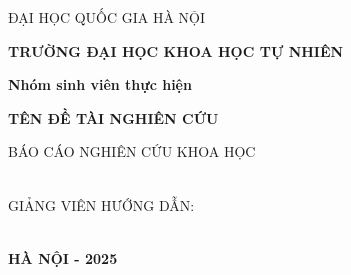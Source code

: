 \begin{titlepage}
\thispagestyle{empty}
\thisfancypage{
\setlength{\fboxrule}{2pt}
\doublebox}{}
\fontsize{15pt}{10pt}\selectfont
\centerline{{ {ĐẠI HỌC QUỐC GIA HÀ NỘI}}}
\centerline{ \bf {TRƯỜNG ĐẠI HỌC KHOA HỌC TỰ NHIÊN}}
\vspace*{2cm}
\centerline{\Large
\textbf{Nhóm sinh viên thực hiện}
}
\fontsize{15pt}{10pt}\selectfont
\vspace*{3cm}
\centerline{ \bf {TÊN ĐỀ TÀI NGHIÊN CỨU}}
\vspace*{0.3cm}

\vspace*{0.3cm}

\vspace*{0.3cm}

\vspace*{2.5cm}

\centerline{ BÁO CÁO NGHIÊN CỨU KHOA HỌC}
\\

\hspace*{5cm} GIẢNG VIÊN HƯỚNG DẪN:
\\
\hspace*{6.5cm}
~~~
\\

\vfill
\centerline{ \bf HÀ NỘI - 2025}
\vspace*{0.3cm}
\end{titlepage}
\thispagestyle{empty}